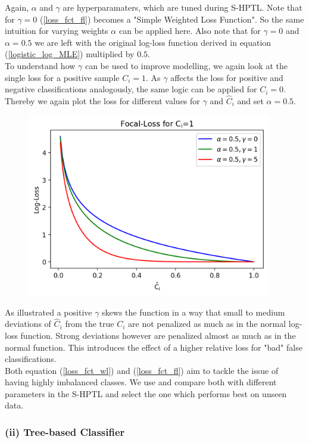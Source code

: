 \documentclass[12pt,titlepage]{article}
\begin{document}
\noindent
Again, $\alpha$ and $\gamma$ are hyperparamaters, which are tuned during S-HPTL. Note that for $\gamma=0$ (\ref{loss_fct_fl}) becomes a "Simple Weighted Loss Function". So the same intuition for varying weights $\alpha$ can be applied here. Also note that for $\gamma=0$ and $\alpha=0.5$ we are left with the original log-loss function derived in equation (\ref{logistic_log_MLE}) multiplied by $0.5$. \\
To understand how $\gamma$ can be used to improve modelling, we again look at the single loss for a positive sample $C_{i}=1$. As $\gamma$ affects the loss for positive and negative classifications analogously, the same logic can be applied for $C_{i}=0$. Thereby we again plot the loss for different values for $\gamma$ and $\hat{C}_{i}$ and set $\alpha=0.5$. \\
\begin{figure}[H]
    \centerline{\includegraphics[height=8cm]{focal_loss.png}}
\end{figure}
\noindent
As illustrated a positive $\gamma$ skews the function in a way that small to medium deviations of $\hat{C}_{i}$ from the true $C_{i}$ are not penalized as much as in the normal log-loss function. Strong deviations however are penalized almost as much as in the normal function. This introduces the effect of a higher relative loss for "bad" false classifications. \\
Both equation (\ref{loss_fct_wl}) and (\ref{loss_fct_fl}) aim to tackle the issue of having highly imbalanced classes. We use and compare both with different parameters in the S-HPTL and select the one which performs best on unseen data. \\

\subsubsection*{(ii) Tree-based Classifier}
\end{document}
